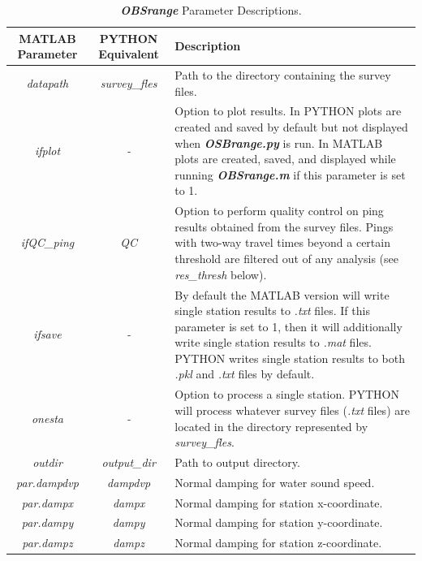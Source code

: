 \documentclass[titlepage, 12pt]{article}
\begin{document}
  \newpage
  \begin{table}[H]
   \centering
   \caption{\textbf{\textit{OBSrange}} Parameter Descriptions.}
   \label{table:params}
   \footnotesize
   \begin{tabularx}{\linewidth}{|c|c|X|}
    \hline
    \textbf{MATLAB Parameter}   & \textbf{PYTHON Equivalent} & \textbf{Description} \\ \hline
    \textit{datapath}           & \textit{survey\_fles}      & Path to the directory containing the survey files.\\ \hline
    \textit{ifplot}             & \textit{-}                 & Option to plot results. In PYTHON plots are created and saved by default but not displayed when \textbf{\textit{OSBrange.py}} is run. In MATLAB plots are created, saved, and displayed while running \textbf{\textit{OBSrange.m}} if this parameter is set to 1.\\ \hline
    \textit{ifQC\_ping}         & \textit{QC}                & Option to perform quality control on ping results obtained from the survey files. Pings with two-way travel times beyond a certain threshold are filtered out of any analysis (see \textit{res\_thresh} below).\\ \hline
    \textit{ifsave}             & \textit{-}                 & By default the MATLAB version will write single station results to \textit{.txt} files. If this parameter is set to 1, then it will additionally write single station results to \textit{.mat} files. PYTHON writes single station results to both \textit{.pkl} and \textit{.txt} files by default.\\ \hline
    \textit{onesta}             & \textit{-}                 & Option to process a single station. PYTHON will process whatever survey files (\textit{.txt} files) are located in the directory represented by \textit{survey\_fles}.\\ \hline
    \textit{outdir}             & \textit{output\_dir}       & Path to output directory.\\ \hline
    \textit{par.dampdvp}        & \textit{dampdvp}           & Normal damping for water sound speed.\\ \hline
    \textit{par.dampx}          & \textit{dampx}             & Normal damping for station x-coordinate.\\ \hline
    \textit{par.dampy}          & \textit{dampy}             & Normal damping for station y-coordinate.\\ \hline
    \textit{par.dampz}          & \textit{dampz}             & Normal damping for station z-coordinate.\\ \hline

\end{tabularx}
\end{table}
\end{document}
